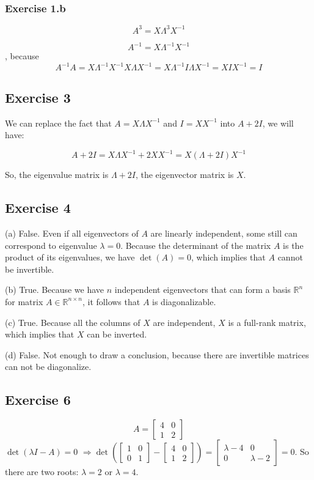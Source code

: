 \documentclass{article}
\begin{document}
\subsubsection{Exercise 1.b}
\[
    A^{3} = X\Lambda^{3}X^{-1}
\]

\[ A^{-1} = X \Lambda^{-1} X^{-1} \], because \[ A^{-1} A = X \Lambda^{-1} X^{-1} X \Lambda X^{-1} = X \Lambda^{-1} I \Lambda X^{-1} = X I X^{-1} = I \]

\subsection{Exercise 3}

We can replace the fact that \( A = X \Lambda X^{-1} \) and \( I = X X^{-1} \) into \( A + 2I \), we will have:

\[
    A + 2I = X \Lambda X^{-1} + 2 X X^{-1}
    = X (\Lambda + 2I) X^{-1}
\]

So, the eigenvalue matrix is \( \Lambda + 2I \), the eigenvector matrix is \( X \).

\subsection{Exercise 4}
(a) False. Even if all eigenvectors of \(A\) are linearly independent, some still can correspond to eigenvalue \(\lambda = 0\). Because the determinant of the matrix \(A\) is the product of its eigenvalues, we have \(\det(A) = 0\), which implies that \(A\) cannot be invertible.

(b) True. Because we have \(n\) independent eigenvectors that can form a basis \(\mathbb{R}^n\) for matrix \(A \in \mathbb{R}^{n \times n}\), it follows that \(A\) is diagonalizable.

(c) True. Because all the columns of \(X\) are independent, \(X\) is a full-rank matrix, which implies that \(X\) can be inverted.

(d) False. Not enough to draw a conclusion, because there are invertible matrices can not be diagonalize.

\subsection{Exercise 6}
\[
    A=
    \begin{bmatrix}
        4 & 0 \\
        1 & 2
    \end{bmatrix}
\]
$\det(\lambda I-A) = 0$
$\Rightarrow \det\left(
    \begin{bmatrix}
            1 & 0 \\
            0 & 1
        \end{bmatrix} -
    \begin{bmatrix}
            4 & 0 \\
            1 & 2
        \end{bmatrix}\right) =
    \begin{bmatrix}
        \lambda - 4 & 0          \\
        0           & \lambda -2
    \end{bmatrix} = 0.$
So there are two roots:
$\lambda = 2$ or $\lambda = 4$.
\end{document}
